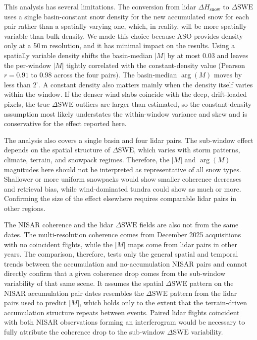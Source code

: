 \documentclass[tc, manuscript]{copernicus}
\begin{document}
This analysis has several limitations. The conversion from lidar $\Delta H_{\mathrm{snow}}$ to $\Delta\mathrm{SWE}$ uses a single basin-constant snow density for the new accumulated snow for each pair rather than a spatially varying one, which, in reality, will be more spatially variable than bulk density. We made this choice because ASO provides density only at a 50\,\unit{m} resolution, and it has minimal impact on the results. Using a spatially variable density shifts the basin-median $|M|$ by at most 0.03 and leaves the per-window $|M|$ tightly correlated with the constant-density value (Pearson $r = 0.91$ to $0.98$ across the four pairs). The basin-median $\arg(M)$ moves by less than $2^\circ$. A constant density also matters mainly when the density itself varies within the window. If the denser wind slabs coincide with the deep, drift-loaded pixels, the true $\Delta\mathrm{SWE}$ outliers are larger than estimated, so the constant-density assumption most likely understates the within-window variance and skew and is conservative for the effect reported here.

The analysis also covers a single basin and four lidar pairs. The sub-window effect depends on the spatial structure of $\Delta\mathrm{SWE}$, which varies with storm patterns, climate, terrain, and snowpack regimes. Therefore, the $|M|$ and $\arg(M)$ magnitudes here should not be interpreted as representative of all snow types. Shallower or more uniform snowpacks would show smaller coherence decreases and retrieval bias, while wind-dominated tundra could show as much or more. Confirming the size of the effect elsewhere requires comparable lidar pairs in other regions.

The NISAR coherence and the lidar $\Delta\mathrm{SWE}$ fields are also not from the same dates. The multi-resolution coherence comes from December 2025 acquisitions with no coincident flights, while the $|M|$ maps come from lidar pairs in other years. The comparison, therefore, tests only the general spatial and temporal trends between the accumulation and no-accumulation NISAR pairs and cannot directly confirm that a given coherence drop comes from the sub-window variability of that same scene. It assumes the spatial $\Delta\mathrm{SWE}$ pattern on the NISAR accumulation pair dates resembles the $\Delta\mathrm{SWE}$ pattern from the lidar pairs used to predict $|M|$, which holds only to the extent that the terrain-driven accumulation structure repeats between events. Paired lidar flights coincident with both NISAR observations forming an interferogram would be necessary to fully attribute the coherence drop to the sub-window $\Delta\mathrm{SWE}$ variability.
\end{document}
